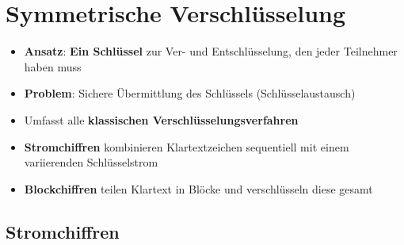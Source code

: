 \section{Symmetrische Verschlüsselung}%
\label{symver:sec:symmetrische_verschluesselung}

\begin{itemize}
	\item \textbf{Ansatz}: \textbf{Ein Schlüssel} zur Ver- und Entschlüsselung, den jeder Teilnehmer haben muss
	\item \textbf{Problem}: Sichere Übermittlung des Schlüssels (Schlüsselaustausch)
	\item Umfasst alle \textbf{klassischen Verschlüsselungsverfahren}
	\item \textbf{Stromchiffren} kombinieren Klartextzeichen sequentiell mit einem variierenden Schlüsselstrom
	\item \textbf{Blockchiffren} teilen Klartext in Blöcke und verschlüsseln diese gesamt
\end{itemize}

\subsection{Stromchiffren}%
\label{symver:sub:stromchiffren}

